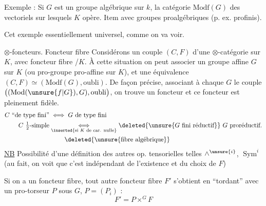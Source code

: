 Exemple : Si $G$ est un groupe algébrique sur $k$, la catégorie $\mathrm{Modf}(G)$ des vectoriels sur lesquels $K$ opère. Item avec groupes proalgébriques (p. ex. profinis).

Cet exemple  essentiellement universel, comme on va voir.

$\otimes$-foncteurs. Foncteur fibre  Considérons un couple $(C,F)$  d'une $\otimes$-catégorie sur $K$, avec foncteur fibre  /$K$. À cette situation  on peut associer un groupe  affine $G$ sur $K$ (ou pro-groupe pro-affine sur $K$), et une équivalence $(C,F)\simeq(\mathrm{Modf}(G),\text{oubli})$.
De façon précise, associant à chaque $G$ le couple $\bigl((\mathrm{Mod}(\unsure{f|G}),G),\text{oubli}\bigr)$, on trouve un foncteur
et ce foncteur est pleinement fidèle.
\[
\begin{aligned}
C\ \text{``de type fini''}&\iff G\text{ de type fini}\\
C\ \tfrac12\text{-simple}&\underset{\inserted{\text{si }K\text{ de car. nulle}}}{\iff}\deleted{\unsure{G\ \text{fini réductif}}}\ G\text{ proréductif}.\\
&\phantom{\iff}\deleted{\unsure{\text{fibre algébrique}}}
\end{aligned}
\]
\uline{NB} Possibilité d'une définition des autres op. tensorielles telles $\wedge^{\unsure{i}}$, $\operatorname{Sym}^i$ (au fait, on voit que c'est indépendant de l'existence et du choix de $F$)

Si on a un foncteur fibre, tout autre foncteur fibre $F'$ s'obtient en ``tordant'' avec un pro-torseur $P$ sous $G$, $P=(P_i)$ :
\[
F'=P\times^G F
\]

